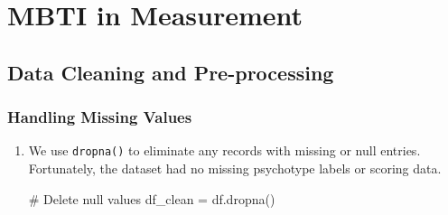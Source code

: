 \documentclass[12pt]{article}
\numberwithin{figure}{section}  %
\begin{document}
\section{MBTI in Measurement} 
	\subsection{Data Cleaning and Pre-processing}
	\subsubsection{Handling Missing Values}
	\begin{enumerate}
		\item We use \texttt{dropna()} to eliminate any records with missing or null
		entries. Fortunately, the dataset had no missing psychotype labels or
		scoring data.
		\begin{python}
# Delete null values
df_clean = df.dropna()
		\end{python}
			
	\end{enumerate}
\end{document}
